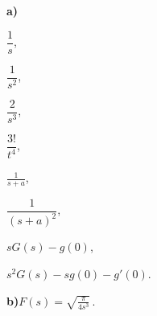 


{
\textbf{a)}\begin{multicols}{3}
\begin{iii}
\item $\dfrac{1}{s}$,
\item $\dfrac{1}{s^2}$,
\item $\dfrac{2}{s^3}$,
\item $\dfrac{3!}{t^4}$,
\item $\frac{1}{s+a}$,
\item $\dfrac{1}{(s+a)^2}$,
\item $ sG(s) - g(0)$,
\item $ s^2G(s) - sg(0) - g'(0)$.
\end{iii}
\end{multicols}
\textbf{b)}$F(s)=\sqrt{\frac{\pi}{4s^3}}\,.$
}
